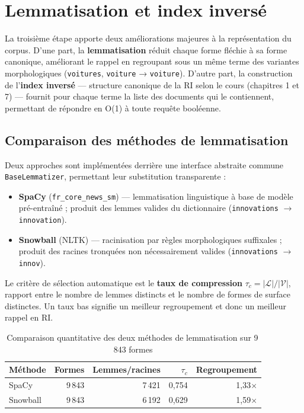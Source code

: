 \chapter{Lemmatisation et index inversé}
\label{chap:td3}

La troisième étape apporte deux améliorations majeures à la représentation du corpus.
D'une part, la \textbf{lemmatisation} réduit chaque forme fléchie à sa forme canonique,
améliorant le rappel en regroupant sous un même terme des variantes morphologiques
(\texttt{voitures}, \texttt{voiture} → \texttt{voiture}). D'autre part, la construction
de l'\textbf{index inversé} — structure canonique de la RI selon le cours (chapitres 1
et 7) — fournit pour chaque terme la liste des documents qui le contiennent, permettant
de répondre en O(1) à toute requête booléenne.

\section{Comparaison des méthodes de lemmatisation}

Deux approches sont implémentées derrière une interface abstraite commune
\texttt{BaseLemmatizer}, permettant leur substitution transparente :

\begin{itemize}
  \item \textbf{SpaCy} (\texttt{fr\_core\_news\_sm}) — lemmatisation linguistique à
        base de modèle pré-entraîné ; produit des lemmes valides du dictionnaire
        (\texttt{innovations} $\to$ \texttt{innovation}).
  \item \textbf{Snowball} (NLTK) — racinisation par règles morphologiques suffixales ;
        produit des racines tronquées non nécessairement valides
        (\texttt{innovations} $\to$ \texttt{innov}).
\end{itemize}

Le critère de sélection automatique est le \textbf{taux de compression} $\tau_c =
|\mathcal{L}|/|\mathcal{V}|$, rapport entre le nombre de lemmes distincts et le nombre
de formes de surface distinctes. Un taux bas signifie un meilleur regroupement et donc
un meilleur rappel en RI.

\begin{table}[ht]
\centering
\caption{Comparaison quantitative des deux méthodes de lemmatisation sur 9\,843 formes}
\label{tab:lemma_compare}
\begin{tabular}{lrrrr}
\toprule
\textbf{Méthode} & \textbf{Formes} & \textbf{Lemmes/racines} & $\tau_c$ & \textbf{Regroupement} \\
\midrule
SpaCy    & 9\,843 & 7\,421 & 0,754 & 1,33$\times$ \\
Snowball & 9\,843 & 6\,192 & 0,629 & 1,59$\times$ \\
\bottomrule
\end{tabular}
\end{table}

